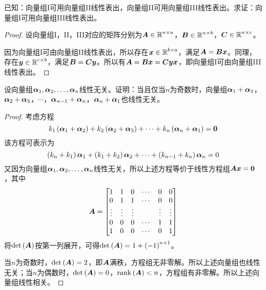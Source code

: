 \begin{problem}\label{problem-2.30}
已知：向量组I可用向量组II线性表出，向量组II可用向量组III线性表出。求证：向量组I可用向量组III线性表出。
\end{problem}
\begin{proof}
    设向量组I，II，III对应的矩阵分别为\(\mata\in\rea^{n\times a}\)，\(\matb\in\rea^{n\times b}\)，\(\matc\in\rea^{n\times c}\)。

    因为向量组I可由向量组II线性表出，所以存在\(\vecx\in\rea^{b\times a}\)，满足\(\mata=\matb\vecx\)。同理，存在\(\vecy\in\rea^{c\times b}\)，满足\(\matb=\matc\vecy\)。所以有\(\mata=\matb\vecx=\matc\vecy\vecx\)，即向量组I可由向量组III线性表出。
\end{proof}

\begin{problem}\label{problem-2.31}
设向量组\(\enums{\vecal}{n}\)线性无关。证明：当且仅当\(n\)为奇数时，向量组\(\vecal_1+\vecal_2\)，\(\vecal_2+\vecal_3\)，\(\cdots\)，\(\vecal_{n-1}+\vecal_n\)，\(\vecal_n+\vecal_1\)也线性无关。
\end{problem}
\begin{proof}
    考虑方程
    \begin{equation*}
        k_1\spar{\vecal_1+\vecal_2}+k_2\spar{\vecal_2+\vecal_3}+\cdots+k_n\spar{\vecal_n+\vecal_1}=\veczero
    \end{equation*}
    该方程可表示为
    \begin{equation*}
        \spar{k_n+k_1}\vecal_1+\spar{k_1+k_2}\vecal_2+\cdots+\spar{k_{n-1}+k_n}\vecal_n=0
    \end{equation*}
    又因为向量组\(\enums{\vecal}{n}\)线性无关，所以上述方程等价于线性方程组\(\mata\vecx=\veczero\)，其中
    \begin{equation*}
        \mata=
        \begin{bmatrix}
            1      & 1      & 0      & \cdots & 0      & 0      \\
            0      & 1      & 1      & \cdots & 0      & 0      \\
            \vdots & \vdots & \vdots &        & \vdots & \vdots \\
            0      & 0      & 0      & \cdots & 1      & 1      \\
            1      & 0      & 0      & \cdots & 0      & 1
        \end{bmatrix}
    \end{equation*}
    将\(\det{\mata}\)按第一列展开，可得\(\det{\mata}=1+\spar{-1}^{n+1}\)。

    当\(n\)为奇数时，\(\det{\mata}=2\)，即\(\mata\)满秩，方程组无非零解。所以上述向量组也线性无关；当\(n\)为偶数时，\(\det{\mata}=0\)，\(\rank{\mata}<n\)，方程组有非零解。所以上述向量组线性相关。
\end{proof}

